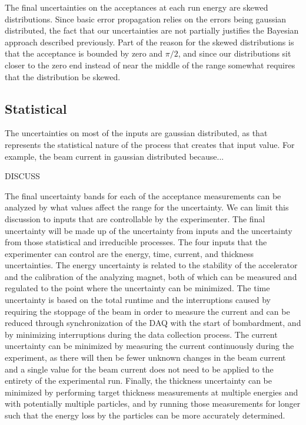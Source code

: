 
The final uncertainties on the acceptances at each run energy are skewed
distributions. Since basic error propagation relies on the errors being
gaussian distributed, the fact that our uncertainties are not partially
justifies the Bayesian approach described previously. Part of the reason
for the skewed distributions is that the acceptance is bounded by zero
and $\pi/2$, and since our distributions sit closer to the zero end instead
of near the middle of the range somewhat requires that the distribution
be skewed.

\subsection{Statistical}

The uncertainties on most of the inputs are gaussian distributed, as
that represents the statistical nature of the process that creates that
input value. For example, the beam current in gaussian distributed
because...

DISCUSS

The final uncertainty bands for each of the acceptance measurements can
be analyzed by what values affect the range for the uncertainty. We can
limit this discussion to inputs that are controllable by the
experimenter. The final uncertainty will be made up of the uncertainty
from inputs and the uncertainty from those statistical and irreducible
processes. The four inputs that the experimenter can control are the
energy, time, current, and thickness uncertainties. The energy
uncertainty is related to the stability of the accelerator and the
calibration of the analyzing magnet, both of which can be measured and
regulated to the point where the uncertainty can be minimized. The time
uncertainty is based on the total runtime and the interruptions caused
by requiring the stoppage of the beam in order to measure the current
and can be reduced through synchronization of the DAQ with the start of
bombardment, and by minimizing interruptions during the data collection
process. The current uncertainty can be minimized by measuring the
current continuously during the experiment, as there will then be fewer
unknown changes in the beam current and a single value for the beam
current does not need to be applied to the entirety of the experimental
run. Finally, the thickness uncertainty can be minimized by performing
target thickness measurements at multiple energies and with potentially
multiple particles, and by running those measurements for longer such
that the energy loss by the particles can be more accurately determined.

